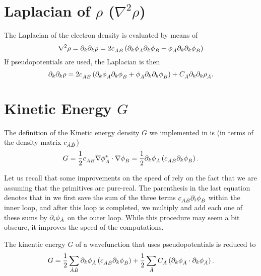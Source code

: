 \section{Laplacian of $\rho$ ($\nabla^2\rho$)}

The Laplacian of the electron density is evaluated by means of
%
\begin{equation}
   \nabla^2\rho=\partial_k\partial_k\rho=2c_{\dot{A}\dot{B}}\left(\partial_k\phi_{\dot{A}}\partial_k\phi_{\dot{B}}+\phi_{\dot{A}}\partial_k\partial_k\phi_{\dot{B}}\right)
\end{equation}
%
If pseudopotentials are used, the Laplacian is then
%
\begin{equation}%
   \partial_k\partial_k\rho=
   2c_{\dA\dB}\left(\partial_k\phi_{\dA}\partial_k\phi_{\dB}+
   \phi_{\dA}\partial_k\partial_k\phi_{\dB}\right)
   +C_{\bA}\partial_k\partial_k\rho_{\bA}.
\end{equation}
%


\section{Kinetic Energy $G$}

The definition of the Kinetic energy density $G$ we implemented in \DTK{} is (in terms of the density matrix $c_{\dot{A}\dot{B}}$)
%
\begin{equation}
   G=\frac{1}{2}c_{\dot{A}\dot{B}}\nabla\phi_{\dot{A}}^*\cdot\nabla\phi_{\dot{B}}=\frac{1}{2}\partial_k\phi_{\dot{A}}\left(c_{\dot{A}\dot{B}}\partial_k\phi_{\dot{B}}\right).
\end{equation}
%

Let us recall that some improvements on the speed of \DTK{} rely on the fact that we are assuming that the primitives are pure-real. The parenthesis in the last equation denotes that in \DTK{} we first save the sum of the three terms $c_{\dot{A}\dot{B}}\partial_i\phi_{\dot{B}}$ within the inner loop, and after this loop is completed, we multiply and add each one of these sums by $\partial_i\phi_{\dot{A}}$ on the outer loop. While this procedure may seem a bit obscure, it improves the speed of the computations.

The kinentic energy $G$ of a wavefunction that uses pseudopotentials is reduced to
%
\begin{equation}%
  G=\frac{1}{2}\sum_{\dA\dB}\partial_k\phi_{\dA}\left(c_{\dA\dB}\partial_k\phi_{\dB}\right)
  +\frac{1}{2}\sum_{\bA}C_{\bA}\left( \partial_k\phi_{\bA}\cdot\partial_k\phi_{\bA} \right).
\end{equation}
%



